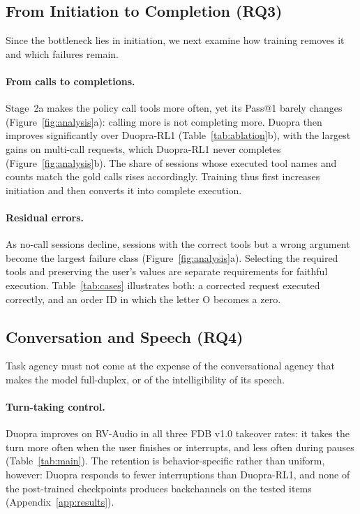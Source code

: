 \subsection{From Initiation to Completion (RQ3)}
\label{sec:failures}



Since the bottleneck lies in initiation, we next examine how training removes it and which failures remain.

\paragraph{From calls to completions.}
Stage~2a makes the policy call tools more often, yet its Pass@1 barely changes (Figure~\ref{fig:analysis}a): calling more is not completing more.
Duopra then improves significantly over Duopra-RL1 (Table~\ref{tab:ablation}b), with the largest gains on multi-call requests, which Duopra-RL1 never completes (Figure~\ref{fig:analysis}b).
The share of sessions whose executed tool names and counts match the gold calls rises accordingly.
Training thus first increases initiation and then converts it into complete execution.

\paragraph{Residual errors.}
As no-call sessions decline, sessions with the correct tools but a wrong argument become the largest failure class (Figure~\ref{fig:analysis}a).
Selecting the required tools and preserving the user's values are separate requirements for faithful execution.
Table~\ref{tab:cases} illustrates both: a corrected request executed correctly, and an order ID in which the letter O becomes a zero.

\subsection{Conversation and Speech (RQ4)}
\label{sec:cost}

Task agency must not come at the expense of the conversational agency that makes the model full-duplex, or of the intelligibility of its speech.

\paragraph{Turn-taking control.}
Duopra improves on RV-Audio in all three FDB v1.0 takeover rates: it takes the turn more often when the user finishes or interrupts, and less often during pauses (Table~\ref{tab:main}).
The retention is behavior-specific rather than uniform, however: Duopra responds to fewer interruptions than Duopra-RL1, and none of the post-trained checkpoints produces backchannels on the tested items (Appendix~\ref{app:results}).

